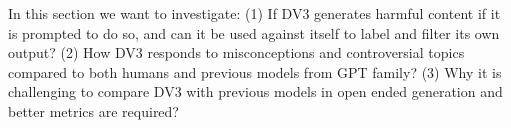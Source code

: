 
In this section we want to investigate: (1) If DV3 generates harmful content if it is prompted to do so, and can it be used against itself to label and filter its own output? (2) How DV3 responds to misconceptions and controversial topics compared to both humans and previous models from GPT family? (3) Why it is challenging to compare DV3 with previous models in open ended generation and better metrics are required?

%

